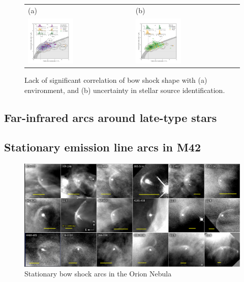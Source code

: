\begin{figure}
  \centering
  \begin{tabular}{ll}
    (a) & (b) \\
    \includegraphics[width=0.45\textwidth]{figs/mipsgal-Rc-R90-environment} &
    \includegraphics[width=0.45\textwidth]{figs/mipsgal-Rc-R90-candidates} 
  \end{tabular}
  \caption[]{Lack of significant correlation of bow shock shape with
    (a) environment, and (b) uncertainty in stellar source
    identification.}
  \label{fig:mipsgal-uncorrelated}
\end{figure}


\subsection{Far-infrared arcs around late-type stars}
\label{sec:far-infrared-arcs}

\subsection{Stationary emission line arcs in M42}
\label{sec:stat-emiss-line}

\begin{figure}
  \centering
  \includegraphics[width=\textwidth]{figs/annotated-ll-arcs}
  \caption[]{Stationary bow shock arcs in the Orion Nebula}
  \label{fig:ll-arcs}
\end{figure}




